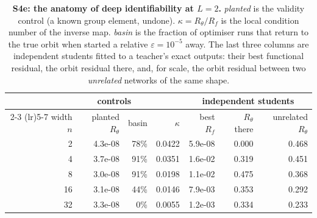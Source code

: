 \begin{table}[t]
\centering\small
\caption{\textbf{S4e: the anatomy of deep identifiability at $L=2$.} \emph{planted} is the validity control (a known group element, undone). $\kappa = R_\theta/R_f$ is the local condition number of the inverse map. \emph{basin} is the fraction of optimiser runs that return to the true orbit when started a relative $\varepsilon = 10^{-5}$ away. The last three columns are independent students fitted to a teacher's exact outputs: their best functional residual, the orbit residual there, and, for scale, the orbit residual between two \emph{unrelated} networks of the same shape.}
\label{tab:s4e}
\begin{tabular}{@{}rrrrrrr@{}}
\toprule
& \multicolumn{2}{c}{controls} & & \multicolumn{3}{c}{independent students} \\
\cmidrule(lr){2-3} \cmidrule(lr){5-7}
width $n$ & planted $R_\theta$ & basin & $\kappa$ & best $R_f$ & $R_\theta$ there & unrelated $R_\theta$ \\
\midrule
2 & 4.3e-08 & 78\% & 0.0422 & 5.9e-08 & 0.000 & 0.468 \\
4 & 3.7e-08 & 91\% & 0.0351 & 1.6e-02 & 0.319 & 0.451 \\
8 & 3.0e-08 & 91\% & 0.0198 & 1.1e-02 & 0.475 & 0.368 \\
16 & 3.1e-08 & 44\% & 0.0146 & 7.9e-03 & 0.353 & 0.292 \\
32 & 3.3e-08 & 0\% & 0.0055 & 1.2e-03 & 0.334 & 0.233 \\
\bottomrule
\end{tabular}
\end{table}
